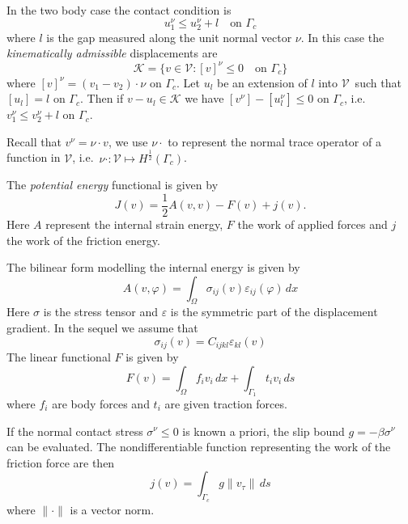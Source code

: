 \documentclass[12pt,a4paper]{article}
\numberwithin{equation}{section}
\numberwithin{table}{section}
\numberwithin{figure}{section}
\newcommand{\half}{\ensuremath{\frac{1}{2}}}
\newcommand{\V}{\ensuremath{\mathcal{V}}}
\newcommand{\K}{\ensuremath{\mathcal{K}}}
\newcommand{\intO}{\int_\Omega\!\!}
\newcommand{\intG}[1][0]{\int_{\Gamma_{#1}}\!\!}
\newcommand{\intGc}{\intG[c]}
\renewcommand{\epsilon}{\varepsilon}
\renewcommand{\phi}{\varphi}
\newcommand{\strain}[1][]{\ensuremath{\epsilon_{#1}}}
\newcommand{\epsij}{\strain[ij]}
\newcommand{\epskl}{\strain[kl]}
\newcommand{\stress}[1][]{\ensuremath{\sigma_{#1}}}
\newcommand{\sigij}{\stress[ij]}
\providecommand{\norm}[1]{\lVert #1 \rVert}
\newcommand{\dx}{{\,dx}}
\newcommand{\ds}{{\,ds}}
\begin{document}
In the two body case the contact condition is
\begin{equation}
  u_1^\nu \le u_2^\nu + l \quad \text{on $\Gamma_c$}
\end{equation}
where $l$ is the gap measured along the unit normal vector $\nu$.  In this case the
\emph{kinematically admissible} displacements are
\begin{equation}
  \label{eq:KinematicallyAdmisibleGap}
  \K = \{v\in \V \colon [v]^\nu \le 0 \quad\text{on }\Gamma_c \}
\end{equation}
where $[v]^\nu = (v_1 - v_2)\cdot \nu$ on $\Gamma_c$.  Let $u_l$ be an extension of $l$ into
\V\ such that $[u_l] = l$ on $\Gamma_c$.  Then if $v-u_l \in \K$ we have
$[v^\nu]-[u_l^\nu] \le 0$ on $\Gamma_c$, i.e.\ $v_1^\nu \le v_2^\nu + l$ on $\Gamma_c$.

Recall that $v^\nu = \nu\cdot v$, we use $\nu\cdot$ to represent the normal trace operator
of a function in \V, i.e.\ $\nu\cdot : \V \mapsto H^{\half}(\Gamma_c)$.

The \emph{potential energy} functional is given by
\begin{equation}
  \label{eq:PotentialEnergy}
  J(v) = \half A(v,v) - F(v) + j(v).
\end{equation}
Here $A$ represent the internal strain energy, $F$ the work of applied forces and $j$ the
work of the friction energy.

The bilinear form modelling the internal energy is given by
\begin{equation}
  \label{eq:InternalEnergy}
  A(v,\phi) = \intO \sigij(v) \epsij(\phi)\dx
\end{equation}
Here $\sigma$ is the stress tensor and $\epsilon$ is the symmetric part of the
displacement gradient.  In the sequel we assume that
\begin{equation}
  \label{eq:29}
  \sigij(v) = C_{ijkl}\epskl(v)
\end{equation}
The linear functional $F$ is given by
\begin{equation}
  \label{eq:30}
  F(v) = \intO f_i v_i \dx + \intG[1] t_i v_i \ds
\end{equation}
where $f_i$ are body forces and $t_i$ are given traction forces.

If the normal contact stress $\sigma^\nu\le 0$ is known a priori, the slip bound
$g=-\beta \sigma^\nu$ can be evaluated.  The nondifferentiable function representing the
work of the friction force are then
\begin{equation}
  \label{eq:FrictionWork}
  j(v) = \intGc g \norm{v_\tau} \ds
\end{equation}
where $\norm{\cdot}$ is a vector norm.
\end{document}
